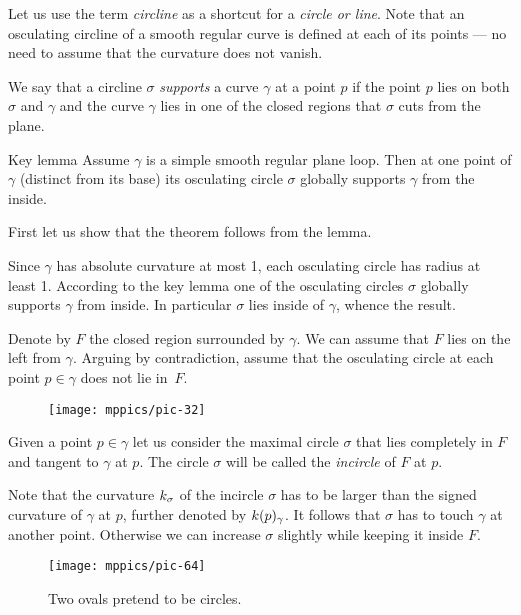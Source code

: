 \documentclass{article}
\begin{document}
Let us use the term \emph{circline} as a shortcut for a \emph{circle or line}.
Note that an osculating circline of a smooth regular curve is defined at each of its points --- no need to assume that the curvature does not vanish.

We say that a circline $\sigma$ \emph{supports} a curve $\gamma$ at a point $p$ if the point $p$ lies on both $\sigma$ and $\gamma$ and the curve $\gamma$ lies in one of the closed regions that $\sigma$ cuts from the plane.

\begin{thm}{Key lemma}\label{thm:moon}
Assume $\gamma$ is a simple smooth regular plane loop.
Then at one point of $\gamma$ (distinct from its base) its osculating circle $\sigma$ globally supports $\gamma$ from the inside.
\end{thm}

First let us show that the theorem follows from the lemma.

Since $\gamma$ has absolute curvature at most 1, each osculating circle has radius at least 1.
According to the key lemma one of the osculating circles $\sigma$ globally supports $\gamma$ from inside.
In particular $\sigma$ lies inside of $\gamma$, whence the result.
\qeds

Denote by $F$ the closed region surrounded by $\gamma$.
We can assume that $F$ lies on the left from $\gamma$.
Arguing by contradiction,
assume that the osculating circle at each point $p\in \gamma$ does not lie in~$F$.

\begin{figure}[!ht]%
\vskip-0mm
\centering
\texttt{[image: mppics/pic-32]}
\vskip0mm
\end{figure}

Given a point $p\in\gamma$ let us consider the maximal circle $\sigma$ that lies completely in $F$ and tangent to $\gamma$ at $p$.
The circle $\sigma$ will be called the {}\emph{incircle} of $F$ at $p$.

Note that the curvature $k_\sigma$ of the incircle $\sigma$ has to be larger than the signed curvature of $\gamma$ at $p$, further denoted by $k(p)_\gamma$.
It follows that $\sigma$ has to touch $\gamma$ at another point.
Otherwise we can increase $\sigma$ slightly while keeping it inside $F$.

\begin{wrapfigure}{r}{32 mm}
\vskip-4mm
\centering
\texttt{[image: mppics/pic-64]}
\caption*{Two ovals pretend to be circles.}
\vskip0mm
\end{wrapfigure}
\end{document}
